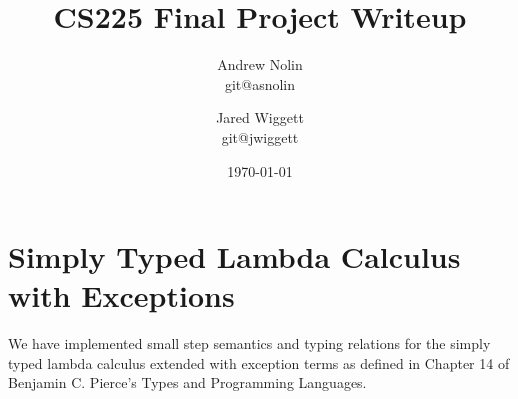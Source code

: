 \documentclass{article}
\title{CS225 Final Project Writeup}
\author{Andrew Nolin \\ git@asnolin \and Jared Wiggett \\ git@jwiggett}
\date{\today}
\begin{document}
\maketitle
\section*{Simply Typed Lambda Calculus with Exceptions}
We have implemented small step semantics and typing relations for the simply typed lambda calculus extended with exception terms as defined in Chapter 14 of Benjamin C. Pierce's Types and Programming Languages.
\end{document}
